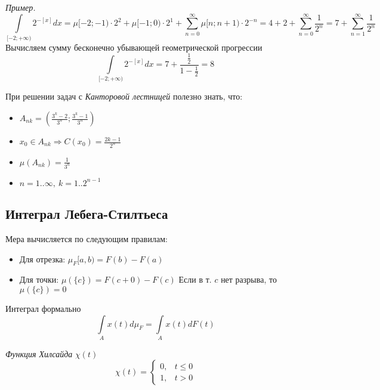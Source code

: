 \documentclass{article}[12pt]
\begin{document}
\par \textit{Пример.}
\begin{displaymath}
    \int\limits_{[-2;+\infty)}2^{-[x]}dx
    =\mu{[-2;-1)}\cdot2^{2} + \mu{[-1;0)}\cdot2^{1}
    + \sum\limits_{n=0}^{\infty}\mu{[n;n+1)}\cdot 2^{-n}
    =4 + 2 + \sum\limits_{n=0}^{\infty}\frac{1}{2^{n}}
    =7 + \sum\limits_{n=1}^{\infty}\frac{1}{2^{n}}
\end{displaymath}
Вычисляем сумму бесконечно убывающей геометрической прогрессии
\begin{displaymath}
    \int\limits_{[-2;+\infty)}2^{-[x]}dx
    = 7 + \frac{\frac{1}{2}}{1-\frac{1}{2}}=8
\end{displaymath}

\par При решении задач с \textit{Канторовой лестницей} полезно знать,
что:
\begin{itemize}
    \item $A_{nk}=\left(\frac{3^{k}-2}{3^{n}};\frac{3^{k}-1}{3^{n}}\right)$
    \item $x_{0}\in A_{nk} \Rightarrow C(x_{0})=\frac{2k-1}{2^{n}}$
    \item $\mu(A_{nk})=\frac{1}{3^{n}}$
    \item $n=1..\infty,\ k=1..2^{n-1}$
\end{itemize}

\subsection{Интеграл Лебега-Стилтьеса}
Мера вычисляется по следующим правилам:
\begin{itemize}
    \item Для отрезка: $\mu_{F}[a,b)=F(b)-F(a)$
    \item Для точки: $\mu(\{c\})=F(c+0)-F(c)$
        \subitem Если в т. $c$ нет разрыва, то $\mu(\{c\})=0$
\end{itemize}
\par Интеграл формально
\begin{displaymath}
    \int\limits_{A}x(t)d\mu_{F}=\int\limits_{A}x(t)dF(t)
\end{displaymath}

\par \textit{Функция Хилсайда} $\chi(t)$
\begin{displaymath}
    \chi(t)=\left\{\begin{array}{ll}
    0, & t \leqslant 0 \\
    1, & t > 0
    \end{array}\right.
\end{displaymath}
\end{document}
